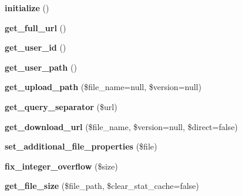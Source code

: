 \begin{DoxyCompactItemize}
\item 
\hypertarget{class_upload_handler_a91098fa7d1917ce4833f284bbef12627}{{\bfseries initialize} ()}\label{class_upload_handler_a91098fa7d1917ce4833f284bbef12627}

\item 
\hypertarget{class_upload_handler_a5de9d120795ba414ded6129cbcec8006}{{\bfseries get\-\_\-full\-\_\-url} ()}\label{class_upload_handler_a5de9d120795ba414ded6129cbcec8006}

\item 
\hypertarget{class_upload_handler_ab844873e74fa4e89157311bb3f5a0167}{{\bfseries get\-\_\-user\-\_\-id} ()}\label{class_upload_handler_ab844873e74fa4e89157311bb3f5a0167}

\item 
\hypertarget{class_upload_handler_a718a236bd5baf364f6fc9d1b427f3267}{{\bfseries get\-\_\-user\-\_\-path} ()}\label{class_upload_handler_a718a236bd5baf364f6fc9d1b427f3267}

\item 
\hypertarget{class_upload_handler_aa28df548183f4309edb5df9db306e980}{{\bfseries get\-\_\-upload\-\_\-path} (\$file\-\_\-name=null, \$version=null)}\label{class_upload_handler_aa28df548183f4309edb5df9db306e980}

\item 
\hypertarget{class_upload_handler_adc2132153d7fe1f1d508da4adae5c5a4}{{\bfseries get\-\_\-query\-\_\-separator} (\$url)}\label{class_upload_handler_adc2132153d7fe1f1d508da4adae5c5a4}

\item 
\hypertarget{class_upload_handler_a7bbc4074999d49c1bcec1e2333a5b6a0}{{\bfseries get\-\_\-download\-\_\-url} (\$file\-\_\-name, \$version=null, \$direct=false)}\label{class_upload_handler_a7bbc4074999d49c1bcec1e2333a5b6a0}

\item 
\hypertarget{class_upload_handler_aa05c4d932e762066ed2f52de2127b709}{{\bfseries set\-\_\-additional\-\_\-file\-\_\-properties} (\$file)}\label{class_upload_handler_aa05c4d932e762066ed2f52de2127b709}

\item 
\hypertarget{class_upload_handler_a9abdfd2889f4f707aa38362ee5d163e7}{{\bfseries fix\-\_\-integer\-\_\-overflow} (\$size)}\label{class_upload_handler_a9abdfd2889f4f707aa38362ee5d163e7}

\item 
\hypertarget{class_upload_handler_ad289968336f13388030bce7977ceb3b8}{{\bfseries get\-\_\-file\-\_\-size} (\$file\-\_\-path, \$clear\-\_\-stat\-\_\-cache=false)}\label{class_upload_handler_ad289968336f13388030bce7977ceb3b8}


\end{DoxyCompactItemize}
